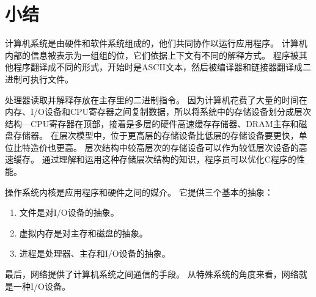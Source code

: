 \section{小结}
{
    计算机系统是由硬件和软件系统组成的，他们共同协作以运行应用程序。
    计算机内部的信息被表示为一组组的位，它们依据上下文有不同的解释方式。
    程序被其他程序翻译成不同的形式，开始时是ASCII文本，然后被编译器和链接器翻译成二进制可执行文件。

    处理器读取并解释存放在主存里的二进制指令。
    因为计算机花费了大量的时间在内存、I/O设备和CPU寄存器之间复制数据，所以将系统中的存储设备划分成层次结构---CPU寄存器在顶部，接着是多层的硬件高速缓存存储器、DRAM主存和磁盘存储器。
    在层次模型中，位于更高层的存储设备比低层的存储设备要更快，单位比特造价也更高。
    层次结构中较高层次的存储设备可以作为较低层次设备的高速缓存。
    通过理解和运用这种存储层次结构的知识，程序员可以优化C程序的性能。

    操作系统内核是应用程序和硬件之间的媒介。
    它提供三个基本的抽象：

    \begin{enumerate}[(1)]
        \item 文件是对I/O设备的抽象。
        \item 虚拟内存是对主存和磁盘的抽象。
        \item 进程是处理器、主存和I/O设备的抽象。
    \end{enumerate}

    最后，网络提供了计算机系统之间通信的手段。
    从特殊系统的角度来看，网络就是一种I/O设备。
}

\endinput
